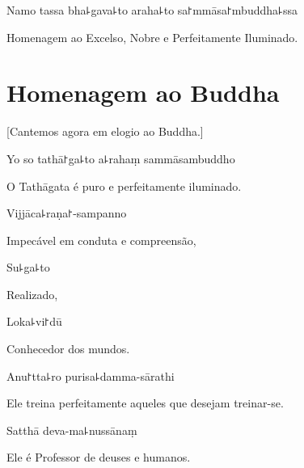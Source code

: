 Namo tassa bha꜕gava꜕to araha꜕to sa꜓mmāsa꜓mbuddha꜕ssa


\begin{english}
  Homenagem ao Excelso, Nobre e Perfeitamente Iluminado.

\end{english}

\clearpage

\chapter{Homenagem ao Buddha}

\begin{leader}
\end{leader}

\begin{english}
  [Cantemos agora em elogio ao Buddha.]
\end{english}

Yo so tathā꜓ga꜕to a꜕rahaṃ sammāsambuddho

\begin{english}
  O Tathāgata é puro e perfeitamente iluminado.
\end{english}

Vijjāca꜕raṇa꜓-sampanno

\begin{english}
  Impecável em conduta e compreensão,
\end{english}

Su꜕ga꜕to

\begin{english}
  Realizado,
\end{english}

Loka꜕vi꜓dū

\begin{english}
  Conhecedor dos mundos.
\end{english}

Anu꜓tta꜕ro purisa꜕damma-sārathi

\begin{english}
  Ele treina perfeitamente aqueles que desejam treinar-se.
\end{english}

Satthā deva-ma꜕nussānaṃ

\begin{english}
  Ele é Professor de deuses e humanos.
\end{english}


